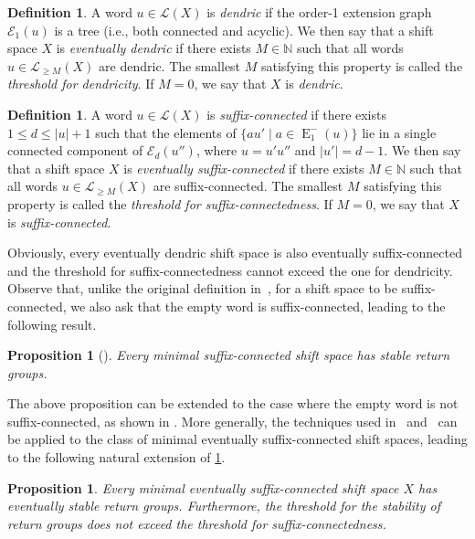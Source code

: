 \documentclass{amsart}
\newcommand*{\nn}{\mathbb{N}}
\newcommand*{\lang}{\mathcal{L}}
\newcommand*{\leftExt}[1]{\operatorname{E}^-_{#1}}
\newcommand*{\ExtGraph}[1]{\mathcal{E}_{#1}}
\theoremstyle{plain}
\newtheorem{proposition}[theorem]{Proposition}
\theoremstyle{definition}
\newtheorem{definition}[theorem]{Definition}
\theoremstyle{remark}
\begin{document}
\begin{definition}
    A word $u \in \lang(X)$ is \emph{dendric} if the order-1 extension graph $\ExtGraph{1}(u)$ is a tree (i.e., both connected and acyclic). 
    We then say that a shift space $X$ is {\em eventually dendric} if there exists $M \in \nn$ such that all words $u \in \lang_{\geq M}(X)$ are dendric. The smallest $M$ satisfying this property is called the {\em threshold for dendricity}. If $M = 0$, we say that $X$ is {\em dendric}.
\end{definition}

\begin{definition}    
    A word $u \in \lang(X)$ is \emph{suffix-connected} if there exists $1 \leq d \le |u| + 1$ such that the elements of $\{au' \mid a \in \leftExt{1}(u)\}$ lie in a single connected component of $\ExtGraph{d}(u'')$, where $u = u'u''$ and $|u'| = d-1$. 
    We then say that a shift space $X$ is {\em eventually suffix-connected} if there exists $M \in \nn$ such that all words $u \in \lang_{\geq M}(X)$ are suffix-connected.
    The smallest $M$ satisfying this property is called the {\em threshold for suffix-connectedness}. If $M = 0$, we say that $X$ is {\em suffix-connected}. 
\end{definition}

Obviously, every eventually dendric shift space is also eventually suffix-connected and the threshold for suffix-connectedness cannot exceed the one for dendricity. Observe that, unlike the original definition in~\cite{Goulet-Ouellet2022}, for a shift space to be suffix-connected, we also ask that the empty word is suffix-connected, leading to the following result.

\begin{proposition}[{\cite[Corollary 1.2]{Goulet-Ouellet2022}}]\label{P:suffix-connected}
    Every minimal suffix-connected shift space has stable return groups.
\end{proposition}

The above proposition can be extended to the case where the empty word is not suffix-connected, as shown in \cite{Goulet-Ouellet2022}. More generally, the techniques used in~\cite{Berthe2015} and~\cite{Goulet-Ouellet2022} can be applied to the class of minimal eventually suffix-connected shift spaces, leading to the following natural extension of \cref{P:suffix-connected}.

\begin{proposition}\label{P:eventually suffix-connected are stable}
    Every minimal eventually suffix-connected shift space $X$ has eventually stable return groups.
    Furthermore, the threshold for the stability of return groups does not exceed the threshold for suffix-connectedness.
\end{proposition}
\end{document}

